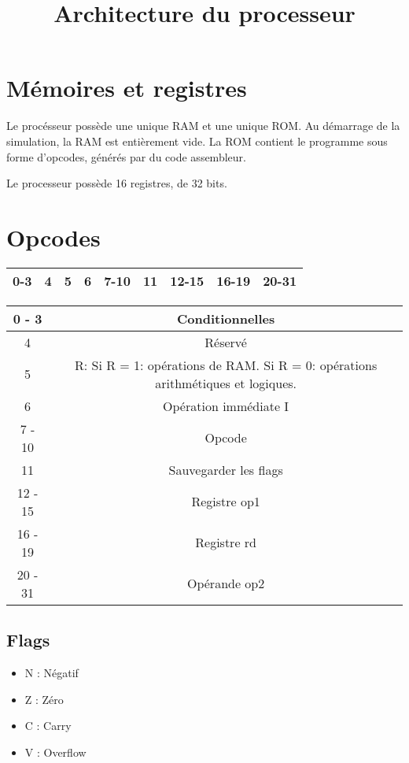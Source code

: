 \documentclass[a4paper]{article}
\title{Architecture du processeur}
\begin{document}
\maketitle

\section{Mémoires et registres}

Le procésseur possède une unique RAM et une unique ROM. Au démarrage de la
simulation, la RAM est entièrement vide. La ROM contient le programme sous forme
d'opcodes, générés par du code assembleur.

Le processeur possède 16 registres, de 32 bits.

\section{Opcodes}
\begin{tabular}{ccccccccc}
  \hline
  0-3 & 4 & 5 & 6 & 7-10 & 11 & 12-15 & 16-19 & 20-31\\
  \hline
\end{tabular} 

\begin{tabular}{|c|c|}
\hline
    0 - 3 & Conditionnelles\\
  \hline
    4 & Réservé\\
  \hline
    5 & R: Si R = 1: opérations de RAM. Si R = 0: opérations arithmétiques et logiques.\\
  \hline
    6 & Opération immédiate I\\
  \hline
    7 - 10 & Opcode\\
  \hline
    11 & Sauvegarder les flags\\
  \hline
    12 - 15 & Registre op1\\
  \hline
    16 - 19 & Registre rd\\
  \hline
    20 - 31 & Opérande op2\\
  \hline
\end{tabular}
  
\subsection{Flags}

  \begin{itemize}
  \item N : Négatif\\
  \item Z : Zéro\\
  \item C : Carry\\
  \item V : Overflow\\
  \end{itemize}
\end{document}
